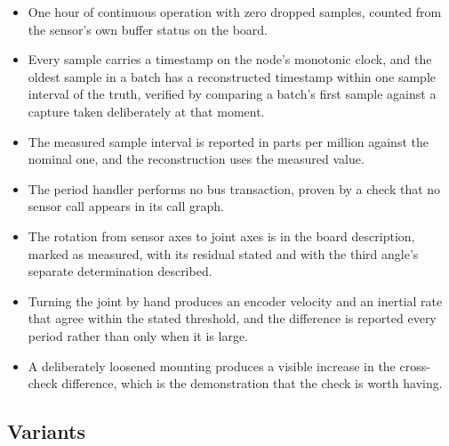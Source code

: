 \begin{itemize}
\item One hour of continuous operation with zero dropped samples, counted from
the sensor's own buffer status on the board.
\item Every sample carries a timestamp on the node's monotonic clock, and the
oldest sample in a batch has a reconstructed timestamp within one sample
interval of the truth, verified by comparing a batch's first sample against a
capture taken deliberately at that moment.
\item The measured sample interval is reported in parts per million against the
nominal one, and the reconstruction uses the measured value.
\item The period handler performs no bus transaction, proven by a check that no
sensor call appears in its call graph.
\item The rotation from sensor axes to joint axes is in the board description,
marked as measured, with its residual stated and with the third angle's separate
determination described.
\item Turning the joint by hand produces an encoder velocity and an inertial
rate that agree within the stated threshold, and the difference is reported
every period rather than only when it is large.
\item A deliberately loosened mounting produces a visible increase in the
cross-check difference, which is the demonstration that the check is worth
having.
\end{itemize}

\subsection*{Variants}

